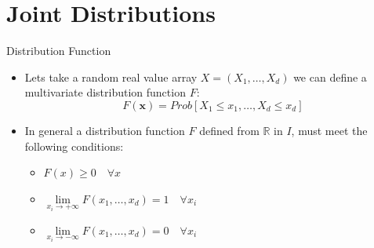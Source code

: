 \documentclass[11pt]{beamer}
\theoremstyle{plain}
\theoremstyle{definition}
\theoremstyle{remark}
\begin{document}
\section{Joint Distributions}
%
\begin{frame}{Distribution Function}
   \begin{itemize}
      \item  Lets take a random real value array $X=(X_1, \dots, X_d)$ we can define a multivariate distribution function $F$:
		$$F(\mathbf{x}) = Prob[X_1 \le x_1, \dots, X_d \le x_d]$$
	   \item In general a distribution function $F$ defined from $\mathbb{R}$ in $I$, must meet the following conditions:
		\begin{itemize}
			\item $F(x) \ge 0 \quad \forall x$
			\item $\lim\limits_{x_i \rightarrow +\infty} F(x_1,\dots,x_d) =1 \quad \forall x_i$
			\item $\lim\limits_{x_i \rightarrow -\infty} F(x_1,\dots,x_d) = 0 \quad \forall x_i$
		\end{itemize}	  
   \end{itemize}
\end{frame}
%
\end{document}
